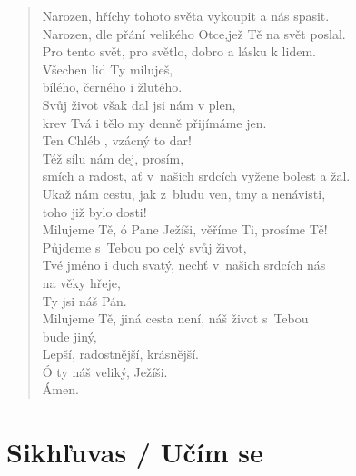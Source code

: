 \begin{verse}
Narozen, hříchy tohoto světa vykoupit a nás spasit. \\ 
Narozen, dle přání velikého Otce,jež Tě na svět poslal. \\ 
Pro tento svět, pro světlo, dobro a lásku  k lidem. \\ 
Všechen lid Ty miluješ, \\ 
bílého, černého i žlutého. \\ 
Svůj život však dal jsi nám v plen, \\ 
krev Tvá i tělo my denně přijímáme jen. \\ 
Ten Chléb , vzácný to dar! \\ 
Též sílu nám dej, prosím, \\ 
smích a radost, ať v našich srdcích vyžene bolest a žal. \\ 
Ukaž nám cestu, jak z bludu ven, tmy a nenávisti,  \\
\hspace{\fill}toho již bylo dosti! \\ 
Milujeme Tě, ó Pane Ježíši, věříme Ti, prosíme Tě! \\ 
Půjdeme s Tebou po celý svůj život, \\ 
Tvé jméno i duch svatý, nechť v našich srdcích nás  \\
\hspace{\fill}na věky hřeje, \\ 
Ty jsi náš Pán. \\ 
Milujeme Tě, jiná cesta není, náš život s Tebou  \\
\hspace{\fill}bude jiný, \\ 
Lepší, radostnější, krásnější. \\ 
Ó ty náš veliký, Ježíši. \\ 
Ámen.
\end{verse}


\section{Sikhľuvas / Učím se}

